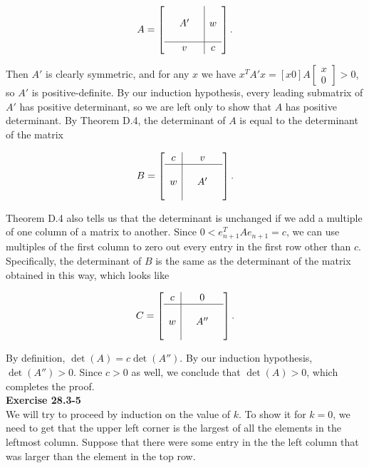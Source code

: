 \documentclass{article}
\begin{document}
\[A = \left[ \begin{array}{ccc|c} & & & \\  & A' & & w \\ & & & \\ \hline & v & & c\end{array} \right]. \]

Then $A'$ is clearly symmetric, and for any $x$ we have $x^T A' x = [x 0] A \left[ \begin{array}{c} x \\ 0 \end{array} \right] > 0$, so $A'$ is positive-definite.  By our induction hypothesis, every leading submatrix of $A'$ has positive determinant, so we are left only to show that $A$ has positive determinant.  By Theorem D.4, the determinant of $A$ is equal to the determinant of the matrix 

\[ B = \left[ \begin{array}{c|ccc}  c &  & v & \\ \hline & & & \\  w & & A' &  \\ & &  & \\ \end{array} \right]. \]

Theorem D.4 also tells us that  the determinant is unchanged if we add a multiple of one column of a matrix to another.  Since $0 < e_{n+1}^T A e_{n+1} = c$, we can use multiples of the first column to zero out every entry in the first row other than $c$.  Specifically, the determinant of $B$ is the same as the determinant of the matrix obtained in this way, which looks like

\[C = \left[ \begin{array}{c|ccc}  c &  & 0 & \\ \hline & & & \\  w & & A'' &  \\ & &  & \\ \end{array} \right]. \]

By definition, $\det(A) = c\det(A'')$.  By our induction hypothesis, $\det(A'') > 0$.  Since $c > 0$ as well, we conclude that $\det(A) > 0$, which completes the proof. \\

\noindent\textbf{Exercise 28.3-5}\\

We will try to proceed by induction on the value of $k$. To show it for $k=0$, we need to get that the upper left corner is the largest of all the elements in the leftmost column. Suppose that there were some entry in the the left column that was larger than the element in the top row.\\
\end{document}
